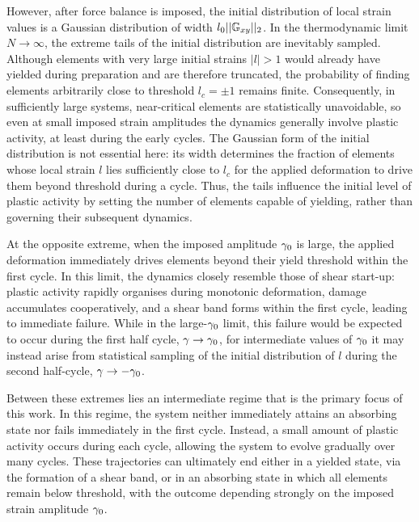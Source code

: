 However, after force balance is imposed, the initial distribution of local strain values is a Gaussian distribution of width $l_0||\mathbb{G}_{xy}||_2$. In the thermodynamic limit $N \to \infty$, the extreme tails of the initial distribution are inevitably sampled. Although elements with very large initial strains $|l|>1$ would already have yielded during preparation and are therefore truncated, the probability of finding elements arbitrarily close to threshold $l_c = \pm 1$ remains finite. Consequently, in sufficiently large systems, near-critical elements are statistically unavoidable, so even at small imposed strain amplitudes the dynamics generally involve plastic activity, at least during the early cycles. The Gaussian form of the initial distribution is not essential here: its width determines the fraction of elements whose local strain $l$ lies sufficiently close to $l_c$ for the applied deformation to drive them beyond threshold during a cycle. Thus, the tails influence the initial level of plastic activity by setting the number of elements capable of yielding, rather than governing their subsequent dynamics.

At the opposite extreme, when the imposed amplitude $\gamma_0$ is large, the applied deformation immediately drives elements beyond their yield threshold within the first cycle. In this limit, the dynamics closely resemble those of shear start-up: plastic activity rapidly organises during monotonic deformation, damage accumulates cooperatively, and a shear band forms within the first cycle, leading to immediate failure. While in the large-$\gamma_0$ limit, this failure would be expected to occur during the first half cycle, $\gamma \to \gamma_0$, for intermediate values of $\gamma_0$ it may instead arise from statistical sampling of the initial distribution of $l$ during the second half-cycle, $\gamma \to -\gamma_0$.

Between these extremes lies an intermediate regime that is the primary focus of this work. In this regime, the system neither immediately attains an absorbing state nor fails immediately in the first cycle. Instead, a small amount of plastic activity occurs during each cycle, allowing the system to evolve gradually over many cycles. These trajectories can ultimately end either in a yielded state, via the formation of a shear band, or in an absorbing state in which all elements remain below threshold, with the outcome depending strongly on the imposed strain amplitude
$\gamma_0$.


